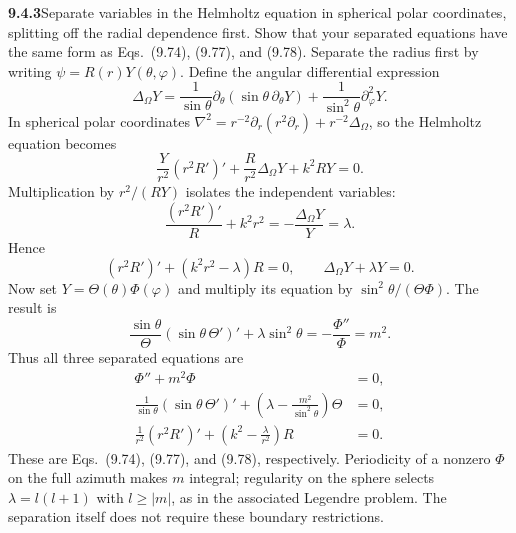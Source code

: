 \par\bigskip
\noindent\textbf{9.4.3}\quad Separate variables in the Helmholtz equation in
spherical polar coordinates, splitting off the radial dependence first. Show
that your separated equations have the same form as Eqs.~(9.74), (9.77), and
(9.78).
\solution
Separate the radius first by writing $\psi=R(r)Y(\theta,\varphi)$.
Define the angular differential expression
\[
\Delta_\Omega Y=
\frac1{\sin\theta}\partial_\theta(\sin\theta\,\partial_\theta Y)
+\frac1{\sin^2\theta}\partial_\varphi^2Y.
\]
In spherical polar coordinates
$\nabla^2=r^{-2}\partial_r(r^2\partial_r)+r^{-2}\Delta_\Omega$, so the
Helmholtz equation becomes
\[
\frac{Y}{r^2}(r^2R')'+\frac{R}{r^2}\Delta_\Omega Y+k^2RY=0.
\]
Multiplication by $r^2/(RY)$ isolates the independent variables:
\[
\frac{(r^2R')'}R+k^2r^2=-\frac{\Delta_\Omega Y}{Y}=\lambda.
\]
Hence
\[
(r^2R')'+(k^2r^2-\lambda)R=0,\qquad
\Delta_\Omega Y+\lambda Y=0.
\]
Now set $Y=\Theta(\theta)\Phi(\varphi)$ and multiply its equation
by $\sin^2\theta/(\Theta\Phi)$.  The result is
\[
\frac{\sin\theta}{\Theta}(\sin\theta\,\Theta')'
+\lambda\sin^2\theta=-\frac{\Phi''}{\Phi}=m^2.
\]
Thus all three separated equations are
\[
\boxed{\begin{aligned}
\Phi''+m^2\Phi&=0,\\
\frac1{\sin\theta}(\sin\theta\,\Theta')'
 +\left(\lambda-\frac{m^2}{\sin^2\theta}\right)\Theta&=0,\\
\frac1{r^2}(r^2R')'+\left(k^2-\frac{\lambda}{r^2}\right)R&=0.
\end{aligned}}
\]
These are Eqs.~(9.74), (9.77), and (9.78), respectively.  Periodicity
of a nonzero $\Phi$ on the full azimuth makes $m$ integral; regularity
on the sphere selects $\lambda=l(l+1)$ with $l\ge|m|$, as in the
associated Legendre problem.  The separation itself does not require
these boundary restrictions.


